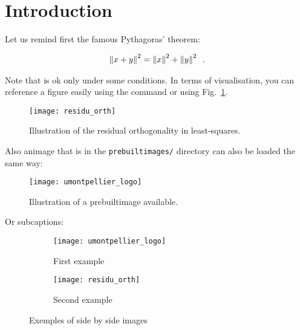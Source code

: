

\section{Introduction}
\label{sec:introduction}

Let us remind first the famous Pythagoras' theorem:

\begin{align}\label{eq:pythagore}
	\left \lVert x+y \right \rVert^2 = \left \lVert x \right \rVert^2 + \left \lVert y \right \rVert^2 \enspace.
\end{align}

Note that  is ok only under some conditions.
In terms of visualisation, you can reference a figure easily using the command  or using Fig.~\ref{fig:pythagore}.

\begin{figure}[h!]
	\centering
	\texttt{[image: residu\_orth]}
	\caption{Illustration of the residual orthogonality in least-squares.}
	\label{fig:pythagore}
\end{figure}


Also animage that is in the \texttt{prebuiltimages/} directory can also be loaded the same way:


\begin{figure}[h!]
	\centering
	\texttt{[image: umontpellier\_logo]}
	\caption{Illustration of a prebuiltimage available.}
	\label{fig:umontpellier_logo}
\end{figure}


Or subcaptions:

\begin{figure}
    \centering
    \begin{subfigure}[b]{0.43\textwidth}
    	\centering
        \texttt{[image: umontpellier\_logo]}%
        \caption{First example}
        \label{subfig:pythagore}
    \end{subfigure}
    \begin{subfigure}[b]{0.56\textwidth}
    	\centering
        \texttt{[image: residu\_orth]}%
        \caption{Second example}
        \label{subfig:logo}
    \end{subfigure}
    \caption{Exemples of side by side images}
    \label{fig:double_example}
\end{figure}


